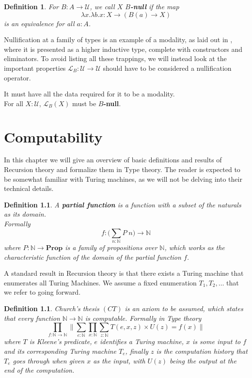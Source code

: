 \documentclass[12pt]{report}
\newtheorem{defn}[thm]{Definition}
\theoremstyle{definition}
\begin{document}
\begin{defn}\label{Bnull}
For $B : A \rightarrow \mathcal{U}$, we call $X$ $B$\textbf{-null} if the map 
$$\lambda x. \lambda b.x : X \rightarrow (B(a) \rightarrow X)$$
is an equivalence for all $a : A$.

\end{defn}

Nullification at a family of types is an example of a modality, as laid out in \cite{1706.07526}, where it is presented as a higher inductive type, complete with constructors and eliminators. 
To avoid listing all these trappings, we will instead look at the important properties $\mathcal{L}_B : \mathcal{U} \rightarrow \mathcal{U}$ should have to be considered a nullification operator. 

It must have all the data required for it to be a modality.\\
For all $X : \mathcal{U}$, $\mathcal{L}_B(X)$ must be $B$\textbf{-null}.

\chapter{Computability}
In this chapter we will give an overview of basic definitions and results of Recursion theory and formalize them in Type theory. 
The reader is expected to be somewhat familiar with Turing machines, as we will not be delving into their technical details. 

\begin{defn}
A \textbf{partial function} is a function with a subset of the naturals as its domain.\\
Formally 
$$f : \Big(\sum_{n : \mathbb{N}} P\; n \Big) \rightarrow \mathbb{N}$$
where $P : \mathbb{N} \rightarrow \mathbf{Prop}$ is a family of propositions over $\mathbb{N}$, which works as the characteristic function of the domain of the partial function $f$.
\end{defn}

A standard result in Recursion theory is that there exists a Turing machine that enumerates all Turing Machines. 
We assume a fixed enumeration $T_1, T_2,\ldots $ that we refer to going forward. 

\begin{defn}\label{CT}
Church's thesis $(CT)$ is an axiom to be assumed, which states that every function $\mathbb{N}\rightarrow \mathbb{N}$ is computable. 
Formally in Type theory
$$\prod_{f : \mathbb{N}\rightarrow \mathbb{N}} \Big\lVert \sum_{e : \mathbb{N}} \prod_{x : \mathbb{N}} \sum_{z : \mathbb{N}} T(e,x,z) \times U(z) = f(x) \Big\rVert$$
where $T$ is Kleene's predicate, $e$ identifies a Turing machine, $x$ is some input to $f$ and its corresponding Turing machine $T_e$, finally $z$ is the computation history that $T_e$ goes through when given $x$ as the input, with $U(z)$ being the output at the end of the computation.
\end{defn}
\end{document}
